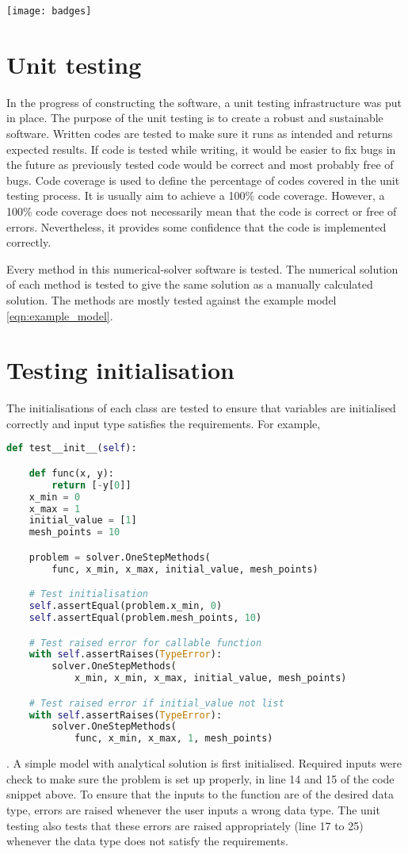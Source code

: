 \texttt{[image: badges]}

\section{Unit testing}
\label{sec:testing}
In the progress of constructing the software, a unit testing infrastructure was put in place. The purpose of the unit testing is to create a robust and sustainable software. Written codes are tested to make sure it runs as intended and returns expected results. If code is tested while writing, it would be easier to fix bugs in the future as previously tested code would be correct and most probably free of bugs. Code coverage is used to define the percentage of codes covered in the unit testing process. It is usually aim to achieve a 100\% code coverage. However, a 100\% code coverage does not necessarily mean that the code is correct or free of errors. Nevertheless, it provides some confidence that the code is implemented correctly.

Every method in this numerical-solver software is tested. The numerical solution of each method is tested to give the same solution as a manually calculated solution. The methods are mostly tested against the example model \ref{eqn:example_model}.

\section{Testing initialisation}
The initialisations of each class are tested to ensure that variables are initialised correctly and input type satisfies the requirements. For example, 

\begin{lstlisting}[language=Python]
def test__init__(self):

    def func(x, y):
        return [-y[0]]
    x_min = 0
    x_max = 1
    initial_value = [1]
    mesh_points = 10

    problem = solver.OneStepMethods(
        func, x_min, x_max, initial_value, mesh_points)

    # Test initialisation
    self.assertEqual(problem.x_min, 0)
    self.assertEqual(problem.mesh_points, 10)

    # Test raised error for callable function
    with self.assertRaises(TypeError):
        solver.OneStepMethods(
            x_min, x_min, x_max, initial_value, mesh_points)

    # Test raised error if initial_value not list
    with self.assertRaises(TypeError):
        solver.OneStepMethods(
            func, x_min, x_max, 1, mesh_points)
\end{lstlisting}
. A simple model with analytical solution is first initialised. Required inputs were check to make sure the problem is set up properly, in line 14 and 15 of the code snippet above. To ensure that the inputs to the function are of the desired data type, errors are raised whenever the user inputs a wrong data type. The unit testing also tests that these errors are raised appropriately (line 17 to 25) whenever the data type does not satisfy the requirements. 

